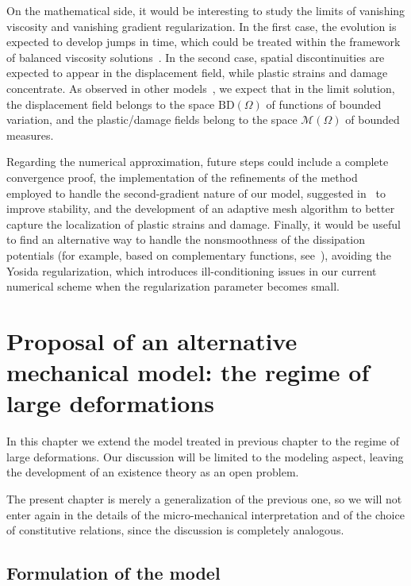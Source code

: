 \documentclass[a4paper,10pt,oneside]{amsbook}
\numberwithin{section}{chapter}
\numberwithin{equation}{chapter}
\theoremstyle{definition}
\begin{document}
On the mathematical side, it would be interesting to study the limits of vanishing viscosity and vanishing gradient regularization. In the first case, the evolution is expected to develop jumps in time, which could be treated within the framework of balanced viscosity solutions~\cite{MieRosSav13}. In the second case, spatial discontinuities are expected to appear in the displacement field, while plastic strains and damage concentrate. As observed in other models~\cite{daldessol09,CriRos21}, we expect that in the limit solution, the displacement field belongs to the space $\text{BD}(\Omega)$ of functions of bounded variation, and the plastic/damage fields belong to the space $\mathcal{M}(\Omega)$ of bounded measures.

Regarding the numerical approximation, future steps could include a complete convergence proof, the implementation of the refinements of the method employed to handle the second-gradient nature of our model, suggested in~\cite{engel2002continuous} to improve stability, and the development of an adaptive mesh algorithm to better capture the localization of plastic strains and damage. Finally, it would be useful to find an alternative way to handle the nonsmoothness of the dissipation potentials (for example, based on complementary functions, see~\cite{lewandowski2023multifield}), avoiding the Yosida regularization, which introduces ill-conditioning issues in our current numerical scheme when the regularization parameter becomes small.

\chapter{Proposal of an alternative mechanical model: the regime of large deformations}
\label{chap:pressure-sensitive-large}

In this chapter we extend the model treated in previous chapter to the regime of large deformations. Our discussion will be limited to the modeling aspect, leaving the development of an existence theory as an open problem.

The present chapter is merely a generalization of the previous one, so we will not enter again in the details of the micro-mechanical interpretation and of the choice of constitutive relations, since the discussion is completely analogous.

\section{Formulation of the model}
\end{document}
